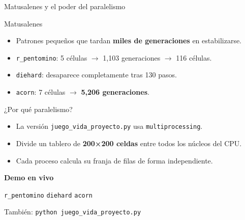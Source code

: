 \documentclass[10pt,aspectratio=169]{beamer}
\newcommand{\demo}[1]{\textcolor{democolor}{\texttt{#1}}}
\begin{document}
\begin{frame}{Matusalenes y el poder del paralelismo}

  \vspace{0.4cm}

  \begin{block}{Matusalenes}
    \begin{itemize}
      \item Patrones pequeños que tardan \textbf{miles de generaciones} en estabilizarse.
      \item \texttt{r\_pentomino}: 5 células $\rightarrow$ 1,103 generaciones $\rightarrow$ 116 células.
      \item \texttt{diehard}: desaparece completamente tras 130 pasos.
      \item \texttt{acorn}: 7 células $\rightarrow$ \textbf{5,206 generaciones}.
    \end{itemize}
  \end{block}

  \begin{block}{¿Por qué paralelismo?}
    \begin{itemize}
      \item La versión \texttt{juego\_vida\_proyecto.py} usa \texttt{multiprocessing}.
      \item Divide un tablero de \textbf{200×200 celdas} entre todos los núcleos del CPU.
      \item Cada proceso calcula su franja de filas de forma independiente.
    \end{itemize}
  \end{block}

  \vspace{0.2cm}

  \begin{center}
    \textbf{Demo en vivo}

    \demo{r\_pentomino} \quad \demo{diehard} \quad \demo{acorn}

    \small También: \texttt{python juego\_vida\_proyecto.py}
  \end{center}
\end{frame}
\end{document}
